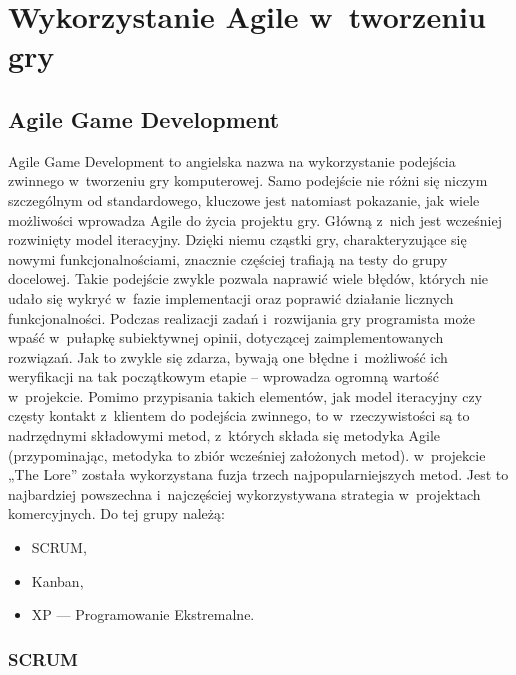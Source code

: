 \documentclass[oneside,polski,logo]{amuthesis}
\begin{document}
\section{Wykorzystanie Agile w~tworzeniu gry}
\subsection{Agile Game Development}
Agile Game Development to angielska nazwa na wykorzystanie podejścia zwinnego w~tworzeniu gry komputerowej. Samo podejście nie różni się niczym szczególnym od standardowego, kluczowe jest natomiast pokazanie, jak wiele możliwości wprowadza Agile do życia projektu gry. Główną z~nich jest wcześniej rozwinięty model iteracyjny. Dzięki niemu cząstki gry, charakteryzujące się nowymi funkcjonalnościami, znacznie częściej trafiają na testy do grupy docelowej. Takie podejście zwykle pozwala naprawić wiele błędów, których nie udało się wykryć w~fazie implementacji oraz poprawić działanie licznych funkcjonalności. Podczas realizacji zadań i~rozwijania gry programista może wpaść w~pułapkę subiektywnej opinii, dotyczącej zaimplementowanych rozwiązań. Jak to zwykle się zdarza, bywają one błędne i~możliwość ich weryfikacji na tak początkowym etapie – wprowadza ogromną wartość w~projekcie. Pomimo przypisania takich elementów, jak model iteracyjny czy częsty kontakt z~klientem do podejścia zwinnego, to w~rzeczywistości są to nadrzędnymi składowymi metod, z~których składa się metodyka Agile (przypominając, metodyka to zbiór wcześniej założonych metod). w~projekcie „The Lore” została wykorzystana fuzja trzech najpopularniejszych metod. Jest to najbardziej powszechna i~najczęściej wykorzystywana strategia w~projektach komercyjnych. \cite{Agile game}\cite{agilePract} Do tej grupy należą:

\begin{itemize}
	\item SCRUM,
	\item Kanban,
	\item XP —  Programowanie Ekstremalne.
\end{itemize}

\subsubsection{SCRUM}
\end{document}
